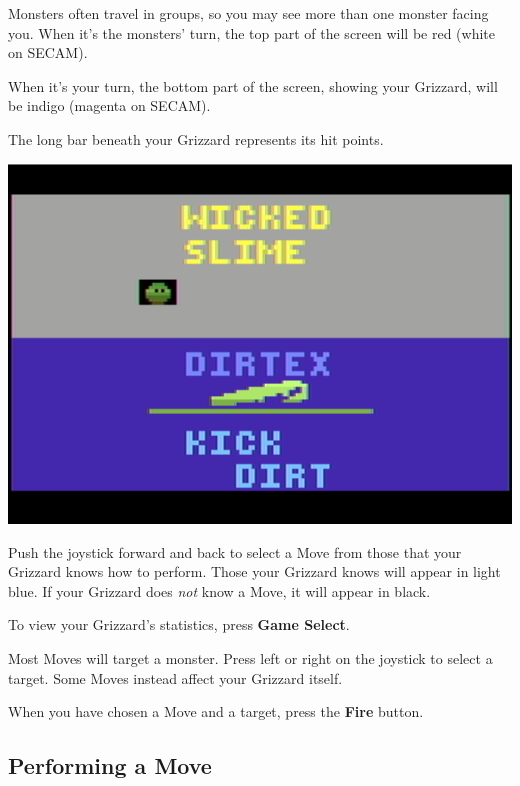 \documentclass[10pt,twocolumn,openany,article]{memoir}
\begin{document}
Monsters often  travel in groups, so  you may see more  than one monster
facing you.  When it's the  monsters' turn, the  top part of  the screen
will be red (white on SECAM).

When  it's your  turn,  the  bottom part  of  the  screen, showing  your
Grizzard, will be indigo (magenta on SECAM).

The long bar beneath your Grizzard represents its hit points.

\begin{center}
  \includegraphics[width=\columnwidth]{../Manual/GrizzardCombatNTSC.png}
\end{center}

Push the joystick forward and back to select a Move from those that your
Grizzard knows how to perform. Those  your Grizzard knows will appear in
light blue. If your Grizzard does \emph{not} know a Move, it will appear
in black.

To view your Grizzard's statistics, press \textbf{Game Select}.

Most Moves will target a monster. Press left or right on the joystick to
select a target. Some Moves instead affect your Grizzard itself.

When   you   have   chosen   a    Move   and   a   target,   press   the
\textbf{Fire} button.


\subsection{Performing a Move}
\end{document}
